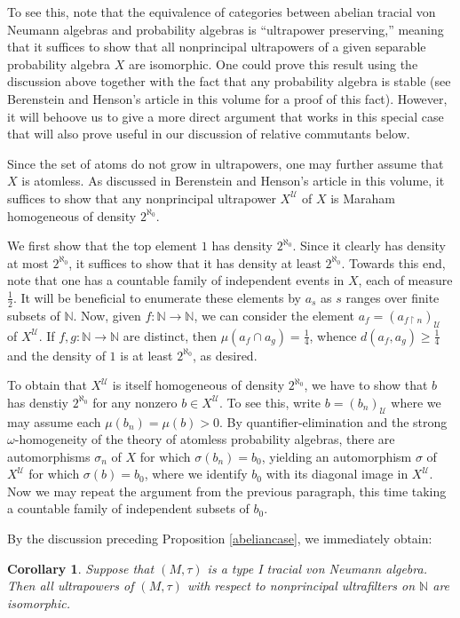 \documentclass[12pt]{amsart}
\newtheorem{cor}[thm]{Corollary}
\theoremstyle{definition}
\def\bb{\mathbb}
\def\bb{\mathbb}
\def\u{\mathsf 1}
\def \u{\mathcal U}
\begin{document}
To see this, note that the equivalence of categories between abelian tracial von Neumann algebras and probability algebras is ``ultrapower preserving,'' meaning that it suffices to show that all nonprincipal ultrapowers of a given separable probability algebra $X$ are isomorphic.  One could prove this result using the discussion above together with the fact that any probability algebra is stable (see Berenstein and Henson's article in this volume for a proof of this fact).  However, it will behoove us to give a more direct argument that works in this special case that will also prove useful in our discussion of relative commutants below.

Since the set of atoms do not grow in ultrapowers, one may further assume that $X$ is atomless.  As discussed in Berenstein and Henson's article in this volume, it suffices to show that any nonprincipal ultrapower $X^\u$ of $X$ is Maraham homogeneous of density $2^{\aleph_0}$.

We first show that the top element $1$ has density $2^{\aleph_0}$.  Since it clearly has density at most $2^{\aleph_0}$, it suffices to show that it has density at least $2^{\aleph_0}$.  Towards this end, note that one has a countable family of independent events in $X$, each of measure $\frac{1}{2}$.  It will be beneficial to enumerate these elements by $a_s$ as $s$ ranges over finite subsets of $\bb N$.  Now, given $f:\bb N\to \bb N$, we can consider the element $a_f=(a_{f\upharpoonright n})_\u$ of $X^\u$.  If $f,g:\bb N\to \bb N$ are distinct, then $\mu(a_f\cap a_g)=\frac{1}{4}$, whence $d(a_f,a_g)\geq \frac{1}{4}$ and the density of $1$ is at least $2^{\aleph_0}$, as desired.

To obtain that $X^\u$ is itself homogeneous of density $2^{\aleph_0}$, we have to show that $b$ has denstiy $2^{\aleph_0}$ for any nonzero $b\in X^\u$.  To see this, write $b=(b_n)_\u$ where we may assume each $\mu(b_n)=\mu(b)>0$.  By quantifier-elimination and the strong $\omega$-homogeneity of the theory of atomless probability algebras, there are automorphisms $\sigma_n$ of $X$ for which $\sigma(b_n)=b_0$, yielding an automorphism $\sigma$ of $X^\u$ for which $\sigma(b)=b_0$, where we identify $b_0$ with its diagonal image in $X^\u$.  Now we may repeat the argument from the previous paragraph, this time taking a countable family of independent subsets of $b_0$.

By the discussion preceding Proposition \ref{abeliancase}, we immediately obtain:

\begin{cor}
Suppose that $(M,\tau)$ is a type I tracial von Neumann algebra.  Then all ultrapowers of $(M,\tau)$ with respect to nonprincipal ultrafilters on $\bb N$ are isomorphic.
\end{cor}
\end{document}
